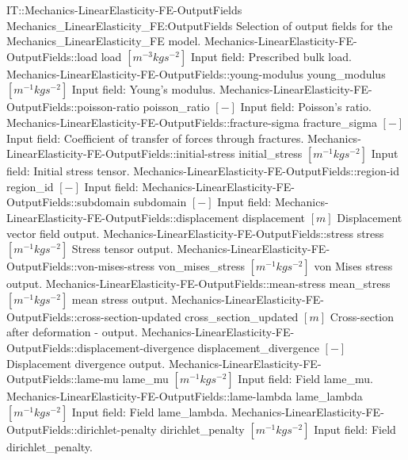 \begin{SelectionType}
	{IT::Mechanics-LinearElasticity-FE-OutputFields}
	{Mechanics{\_}LinearElasticity{\_}FE:OutputFields}
	{{{Selection of output fields for the Mechanics{\_}LinearElasticity{\_}FE model.}%
}}
		\SelectionItem
			{Mechanics-LinearElasticity-FE-OutputFields::load}
			{load}
			{{{}{$[m^{-3}kgs^{-2}]$}{ Input field: Prescribed bulk load.}%
}}
		\SelectionItem
			{Mechanics-LinearElasticity-FE-OutputFields::young-modulus}
			{young{\_}modulus}
			{{{}{$[m^{-1}kgs^{-2}]$}{ Input field: Young's modulus.}%
}}
		\SelectionItem
			{Mechanics-LinearElasticity-FE-OutputFields::poisson-ratio}
			{poisson{\_}ratio}
			{{{}{$[-]$}{ Input field: Poisson's ratio.}%
}}
		\SelectionItem
			{Mechanics-LinearElasticity-FE-OutputFields::fracture-sigma}
			{fracture{\_}sigma}
			{{{}{$[-]$}{ Input field: Coefficient of transfer of forces through fractures.}%
}}
		\SelectionItem
			{Mechanics-LinearElasticity-FE-OutputFields::initial-stress}
			{initial{\_}stress}
			{{{}{$[m^{-1}kgs^{-2}]$}{ Input field: Initial stress tensor.}%
}}
		\SelectionItem
			{Mechanics-LinearElasticity-FE-OutputFields::region-id}
			{region{\_}id}
			{{{}{$[-]$}{ Input field: }%
}}
		\SelectionItem
			{Mechanics-LinearElasticity-FE-OutputFields::subdomain}
			{subdomain}
			{{{}{$[-]$}{ Input field: }%
}}
		\SelectionItem
			{Mechanics-LinearElasticity-FE-OutputFields::displacement}
			{displacement}
			{{{}{$[m]$}{ Displacement vector field output.}%
}}
		\SelectionItem
			{Mechanics-LinearElasticity-FE-OutputFields::stress}
			{stress}
			{{{}{$[m^{-1}kgs^{-2}]$}{ Stress tensor output.}%
}}
		\SelectionItem
			{Mechanics-LinearElasticity-FE-OutputFields::von-mises-stress}
			{von{\_}mises{\_}stress}
			{{{}{$[m^{-1}kgs^{-2}]$}{ von Mises stress output.}%
}}
		\SelectionItem
			{Mechanics-LinearElasticity-FE-OutputFields::mean-stress}
			{mean{\_}stress}
			{{{}{$[m^{-1}kgs^{-2}]$}{ mean stress output.}%
}}
		\SelectionItem
			{Mechanics-LinearElasticity-FE-OutputFields::cross-section-updated}
			{cross{\_}section{\_}updated}
			{{{}{$[m]$}{ Cross-section after deformation - output.}%
}}
		\SelectionItem
			{Mechanics-LinearElasticity-FE-OutputFields::displacement-divergence}
			{displacement{\_}divergence}
			{{{}{$[-]$}{ Displacement divergence output.}%
}}
		\SelectionItem
			{Mechanics-LinearElasticity-FE-OutputFields::lame-mu}
			{lame{\_}mu}
			{{{}{$[m^{-1}kgs^{-2}]$}{ Input field: Field lame{\_}mu.}%
}}
		\SelectionItem
			{Mechanics-LinearElasticity-FE-OutputFields::lame-lambda}
			{lame{\_}lambda}
			{{{}{$[m^{-1}kgs^{-2}]$}{ Input field: Field lame{\_}lambda.}%
}}
		\SelectionItem
			{Mechanics-LinearElasticity-FE-OutputFields::dirichlet-penalty}
			{dirichlet{\_}penalty}
			{{{}{$[m^{-1}kgs^{-2}]$}{ Input field: Field dirichlet{\_}penalty.}%
}}
\end{SelectionType}
